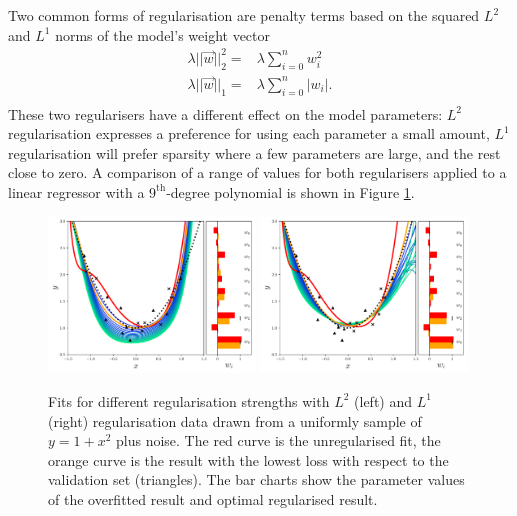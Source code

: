 Two common forms of regularisation are penalty terms based on the squared $L^{2}$ and $L^{1}$ norms of the model's weight vector
\begin{equation}
    \begin{split}
        \lambda||\vec{w}||^{2}_{2} =& \lambda\sum_{i=0}^{n}w_{i}^{2} \\
        \lambda||\vec{w}||_{1} =& \lambda\sum_{i=0}^{n}|w_{i}|. \\
    \end{split}
\end{equation}
These two regularisers have a different effect on the model parameters: $L^{2}$ regularisation expresses a preference for using each parameter a small amount, $L^{1}$ regularisation will prefer sparsity where a few parameters are large, and the rest close to zero. 
A comparison of a range of values for both regularisers applied to a linear regressor with a $9^{\mathrm{th}}$-degree polynomial is shown in Figure \ref{fig:machine_learning:reg_example}. 
\begin{figure}[h!]
    \begin{center}
        \includegraphics[width=0.49\textwidth]{figures/machine_learning/L2_reg_plot.pdf}
        \includegraphics[width=0.49\textwidth]{figures/machine_learning/L1_reg_plot.pdf}
    \end{center}
    \caption{Fits for different regularisation strengths with $L^{2}$ (left) and $L^{1}$ (right) regularisation data drawn from a uniformly sample of $y=1+x^{2}$ plus noise. The red curve is the unregularised fit, the orange curve is the result with the lowest loss with respect to the validation set (triangles). The bar charts show the parameter values of the overfitted result and optimal regularised result.} 
        \label{fig:machine_learning:reg_example}
\end{figure}

